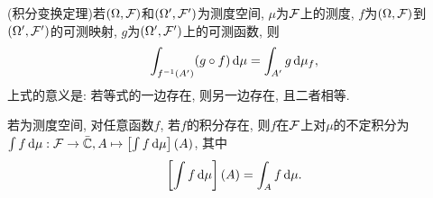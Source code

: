 \begin{theorem}
    (积分变换定理)若$(\Omega,\mathcal{F})$和$(\Omega',\mathcal{F}')$为测度空间, $\mu$为$\mathcal{F}$上的测度, $f$为$(\Omega,\mathcal{F})$到$(\Omega',\mathcal{F}')$的可测映射, $g$为$(\Omega',\mathcal{F}')$上的可测函数, 则
    \begin{equation}
        \int_{f^{-1}(A')}(g\circ f)\,\mathrm{d}\mu=\int_{A'}g\,\mathrm{d}\mu_f,
    \end{equation}
    上式的意义是: 若等式的一边存在, 则另一边存在, 且二者相等.
\end{theorem}

\begin{definition}
    若\s{}为测度空间, 对任意函数$f$, 若$f$的积分存在, 则$f$在$\mathcal{F}$上对$\mu$的不定积分为$\int f\,\mathrm{d}\mu:\mathcal{F}\to\bar{\mathbb{C}},A\mapsto\left[\int f\,\mathrm{d}\mu\right](A)$, 其中
    \begin{equation}
        \left[\int f\,\mathrm{d}\mu\right](A)=\int_A f\,\mathrm{d}\mu.
    \end{equation}
\end{definition}
